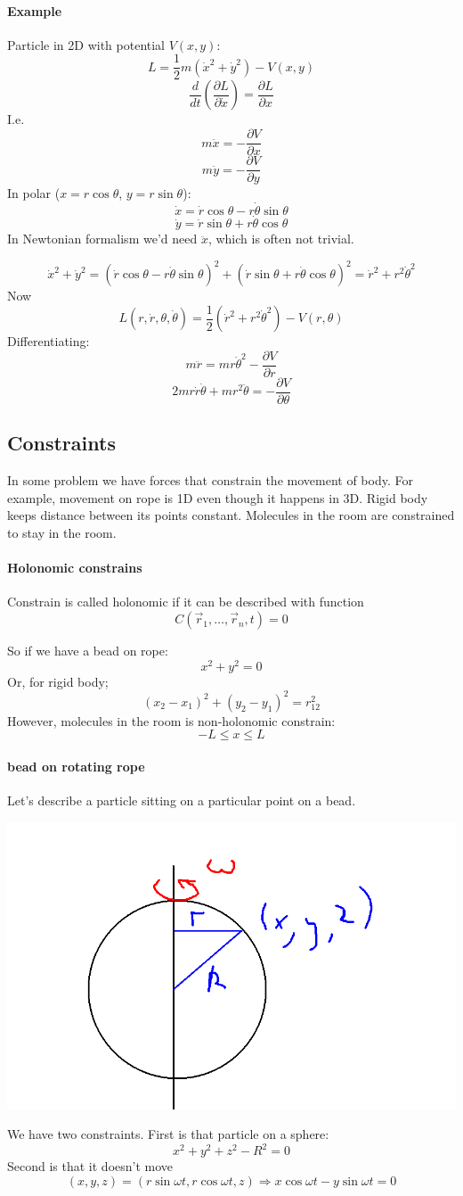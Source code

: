 \paragraph{Example}
Particle in 2D with potential $V(x,y)$:
$$L = \frac{1}{2}m(\dot{x}^2 + \dot{y}^2)-V(x,y)$$
$$\frac{d}{dt}\left( \frac{\partial L}{\partial \dot{x}} \right) = \frac{\partial L}{\partial x}$$
I.e.
$$m\ddot{x} = -\frac{\partial V}{\partial x}$$
$$m\ddot{y} = -\frac{\partial V}{\partial y}$$
In polar ($x=r\cos \theta$, $y=r\sin \theta$):
$$\dot{x} = \dot{r} \cos \theta - r\dot{\theta} \sin \theta$$
$$\dot{y} = \dot{r} \sin \theta + r\dot{\theta} \cos \theta$$
In Newtonian formalism we'd need $\ddot{x}$, which is often not trivial.

$$\dot{x}^2 + \dot{y}^2 = (\dot{r} \cos \theta - r\dot{\theta} \sin \theta)^2 + (\dot{r} \sin \theta + r\dot{\theta} \cos \theta)^2 = \dot{r}^2 + r^2 \dot{\theta}^2$$
Now
$$L(r,\dot{r},\theta,\dot{\theta}) = \frac{1}{2}(\dot{r}^2+r^2\dot{\theta}^2) - V(r, \theta)$$
Differentiating:
$$m\ddot{r} = mr\dot{\theta}^2 - \frac{\partial V}{\partial r}$$
$$2mr\dot{r}\dot{\theta} + mr^2 \ddot{\theta} = - \frac{\partial V}{\partial \theta}$$
\subsection{Constraints}
In some problem we have forces that constrain the movement of body. For example, movement on rope is 1D even though it happens in 3D. Rigid body keeps distance between its points constant. Molecules in the room are constrained to stay in the room. 
\paragraph{Holonomic constrains}
Constrain is called holonomic if it can be described with function
$$C(\vec{r}_1,\dots,\vec{r}_n, t) = 0$$

So if we have a bead on rope:
$$x^2+y^2=0$$
Or, for rigid body;
$$(x_2-x_1)^2 + (y_2-y_1)^2 = r_{12}^2$$
However, molecules in the room is non-holonomic constrain:
$$-L \leq x \leq L$$
\paragraph{bead on rotating rope}
Let's describe a particle sitting on a particular point on a bead.


\begin{center}
	\includegraphics[width=0.5\linewidth]{./lect4/1.png}
\end{center}
We have two constraints. First is that particle on a sphere:
$$x^2+y^2+z^2-R^2 = 0$$
Second is that it doesn't move
$$(x,y,z) = (r\sin \omega t, r\cos \omega t, z) \Rightarrow x\cos \omega t - y\sin \omega t = 0$$

